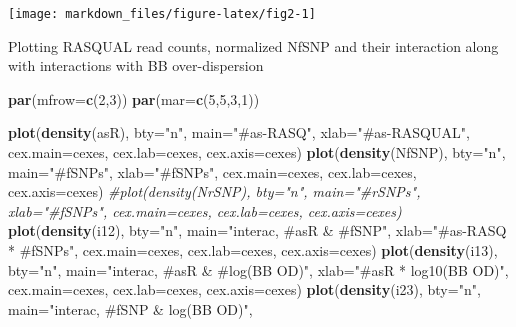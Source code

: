 \documentclass[]{article}
\newenvironment{Shaded}{\begin{snugshade}}{\end{snugshade}}
\newcommand{\KeywordTok}[1]{\textcolor[rgb]{0.13,0.29,0.53}{\textbf{#1}}}
\newcommand{\DataTypeTok}[1]{\textcolor[rgb]{0.13,0.29,0.53}{#1}}
\newcommand{\DecValTok}[1]{\textcolor[rgb]{0.00,0.00,0.81}{#1}}
\newcommand{\StringTok}[1]{\textcolor[rgb]{0.31,0.60,0.02}{#1}}
\newcommand{\CommentTok}[1]{\textcolor[rgb]{0.56,0.35,0.01}{\textit{#1}}}
\newcommand{\NormalTok}[1]{#1}
\begin{document}
\begin{center}\texttt{[image: markdown\_files/figure-latex/fig2-1]} \end{center}

Plotting RASQUAL read counts, normalized NfSNP and their interaction
along with interactions with BB over-dispersion

\begin{Shaded}
\begin{Highlighting}[]
\KeywordTok{par}\NormalTok{(}\DataTypeTok{mfrow=}\KeywordTok{c}\NormalTok{(}\DecValTok{2}\NormalTok{,}\DecValTok{3}\NormalTok{))}
\KeywordTok{par}\NormalTok{(}\DataTypeTok{mar=}\KeywordTok{c}\NormalTok{(}\DecValTok{5}\NormalTok{,}\DecValTok{5}\NormalTok{,}\DecValTok{3}\NormalTok{,}\DecValTok{1}\NormalTok{))}

\KeywordTok{plot}\NormalTok{(}\KeywordTok{density}\NormalTok{(asR), }\DataTypeTok{bty=}\StringTok{"n"}\NormalTok{, }\DataTypeTok{main=}\StringTok{"#as-RASQ"}\NormalTok{, }\DataTypeTok{xlab=}\StringTok{"#as-RASQUAL"}\NormalTok{, }\DataTypeTok{cex.main=}\NormalTok{cexes, }\DataTypeTok{cex.lab=}\NormalTok{cexes, }\DataTypeTok{cex.axis=}\NormalTok{cexes)}
\KeywordTok{plot}\NormalTok{(}\KeywordTok{density}\NormalTok{(NfSNP), }\DataTypeTok{bty=}\StringTok{"n"}\NormalTok{, }\DataTypeTok{main=}\StringTok{"#fSNPs"}\NormalTok{, }\DataTypeTok{xlab=}\StringTok{"#fSNPs"}\NormalTok{, }\DataTypeTok{cex.main=}\NormalTok{cexes, }\DataTypeTok{cex.lab=}\NormalTok{cexes, }\DataTypeTok{cex.axis=}\NormalTok{cexes)}
\CommentTok{#plot(density(NrSNP), bty="n", main="#rSNPs", xlab="#fSNPs", cex.main=cexes, cex.lab=cexes, cex.axis=cexes)}
\KeywordTok{plot}\NormalTok{(}\KeywordTok{density}\NormalTok{(i12), }\DataTypeTok{bty=}\StringTok{"n"}\NormalTok{, }\DataTypeTok{main=}\StringTok{"interac, #asR & #fSNP"}\NormalTok{, }
     \DataTypeTok{xlab=}\StringTok{"#as-RASQ * #fSNPs"}\NormalTok{, }\DataTypeTok{cex.main=}\NormalTok{cexes, }\DataTypeTok{cex.lab=}\NormalTok{cexes, }\DataTypeTok{cex.axis=}\NormalTok{cexes)}
\KeywordTok{plot}\NormalTok{(}\KeywordTok{density}\NormalTok{(i13), }\DataTypeTok{bty=}\StringTok{"n"}\NormalTok{, }\DataTypeTok{main=}\StringTok{"interac, #asR & #log(BB OD)"}\NormalTok{, }
     \DataTypeTok{xlab=}\StringTok{"#asR * log10(BB OD)"}\NormalTok{, }\DataTypeTok{cex.main=}\NormalTok{cexes, }\DataTypeTok{cex.lab=}\NormalTok{cexes, }\DataTypeTok{cex.axis=}\NormalTok{cexes)}
\KeywordTok{plot}\NormalTok{(}\KeywordTok{density}\NormalTok{(i23), }\DataTypeTok{bty=}\StringTok{"n"}\NormalTok{, }\DataTypeTok{main=}\StringTok{"interac, #fSNP & log(BB OD)"}\NormalTok{, }

\end{Highlighting}
\end{Shaded}
\end{document}
